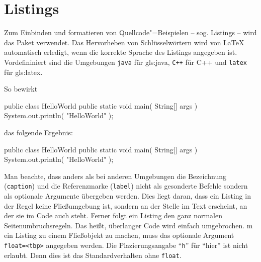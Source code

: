 \section{Listings}%
\label{sec:Listings}
%
Zum Einbinden und formatieren von Quellcode"=Beispielen
-- sog. Listings -- wird das Paket 
\parencite{Hoffmann2014} verwendet.
Das Hervorheben von Schlüsselwörtern
wird von LaTeX automatisch erledigt,
wenn die korrekte Sprache des Listings angegeben ist.
Vordefininiert sind die Umgebungen \texttt{java} für \gls{gls:java},
\texttt{C++} für C++ und \texttt{latex} für \gls{gls:latex}.

So bewirkt
%
\begin{latex}[caption={Beispiel eines Listings in Java},label={lst:listing}]
\begin{java}[caption={A Java Hello-World example},%
             label={lst:hello-world}]
public class HelloWorld {
  public static void main( String[] args ) {
    System.out.println( "HelloWorld" );
  }
}
\end{java}
\end{latex}
%
das folgende Ergebnis:
%
\begin{java}[caption={A Java Hello-World example},label={lst:hello-world}]
public class HelloWorld {
  public static void main( String[] args ) {
    System.out.println( "HelloWorld" );
  }
}
\end{java}

Man beachte, dass anders als bei anderen Umgebungen
die Bezeichnung (\texttt{caption}) und die Referenzmarke (\texttt{label})
nicht als gesonderte Befehle sondern als optionale Argumente übergeben werden.
Dies liegt daran, dass ein Listing in der Regel keine Fließumgebung ist,
sondern an der Stelle im Text erscheint, an der sie im Code auch steht.
Ferner folgt ein Listing den ganz normalen Seitenumbruchsregeln.
Das heißt, überlanger Code wird einfach umgebrochen. 
m ein Listing zu einem Fließobjekt zu machen, muss das optionale Argument
\texttt{float=<tbp>} angegeben werden.
Die Plazierungsangabe \enquote{\texttt{h}} für \enquote{hier}
ist nicht erlaubt. Denn dies ist das Standardverhalten ohne \texttt{float}.